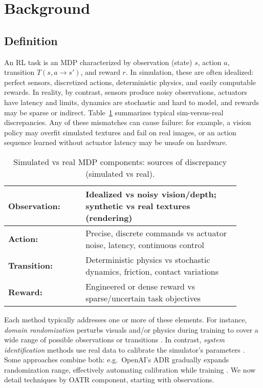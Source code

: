 \section{Background}
\subsection{Definition}
An RL task is an MDP characterized by observation (state) $s$, action $a$, transition $T(s,a\to s')$, and reward $r$. In simulation, these are often idealized: perfect sensors, discretized actions, deterministic physics, and easily computable rewards. In reality, by contrast, sensors produce noisy observations, actuators have latency and limits, dynamics are stochastic and hard to model, and rewards may be sparse or indirect. Table~\ref{tab:elements} summarizes typical sim-versus-real discrepancies. Any of these mismatches can cause failure: for example, a vision policy may overfit simulated textures and fail on real images, or an action sequence learned without actuator latency may be unsafe on hardware.

\begin{table}[htbp]
    \centering
    \caption{Simulated vs real MDP components: sources of discrepancy (simulated vs real).}
    \begin{tabular}{|p{0.3\linewidth}|p{0.6\linewidth}|}
        \hline
        \textbf{Observation:} & Idealized vs noisy vision/depth; synthetic vs real textures (rendering) \\
        \hline
        \textbf{Action:} & Precise, discrete commands vs actuator noise, latency, continuous control \\
        \hline
        \textbf{Transition:} & Deterministic physics vs stochastic dynamics, friction, contact variations \\
        \hline
        \textbf{Reward:} & Engineered or dense reward vs sparse/uncertain task objectives \\
        \hline
    \end{tabular}
    \label{tab:elements}
\end{table}

Each \simtoreal method typically addresses one or more of these elements. For instance, \emph{domain randomization} perturbs visuals and/or physics during training to cover a wide range of possible observations or transitions {\cite{Tobin2017,Sadeghi2017}}. In contrast, \emph{system identification} methods use real data to calibrate the simulator’s parameters {\cite{Chebotar2019}}. Some approaches combine both: e.g.\ OpenAI’s ADR gradually expands randomization range, effectively automating calibration while training {\cite{Akkaya2019}}. We now detail techniques by OATR component, starting with observations.

